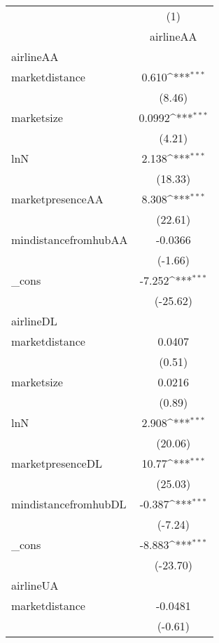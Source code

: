 {
\def\sym#1{\ifmmode^{#1}\else\(^{#1}\)\fi}
\begin{tabular}{l*{1}{c}}
\hline\hline
            &\multicolumn{1}{c}{(1)}\\
            &\multicolumn{1}{c}{airlineAA}\\
\hline
airlineAA   &                     \\
marketdistance&       0.610\sym{***}\\
            &      (8.46)         \\
[1em]
marketsize  &      0.0992\sym{***}\\
            &      (4.21)         \\
[1em]
lnN         &       2.138\sym{***}\\
            &     (18.33)         \\
[1em]
marketpresenceAA&       8.308\sym{***}\\
            &     (22.61)         \\
[1em]
mindistancefromhubAA&     -0.0366         \\
            &     (-1.66)         \\
[1em]
\_cons      &      -7.252\sym{***}\\
            &    (-25.62)         \\
\hline
airlineDL   &                     \\
marketdistance&      0.0407         \\
            &      (0.51)         \\
[1em]
marketsize  &      0.0216         \\
            &      (0.89)         \\
[1em]
lnN         &       2.908\sym{***}\\
            &     (20.06)         \\
[1em]
marketpresenceDL&       10.77\sym{***}\\
            &     (25.03)         \\
[1em]
mindistancefromhubDL&      -0.387\sym{***}\\
            &     (-7.24)         \\
[1em]
\_cons      &      -8.883\sym{***}\\
            &    (-23.70)         \\
\hline
airlineUA   &                     \\
marketdistance&     -0.0481         \\
            &     (-0.61)         \\

\end{tabular}}
